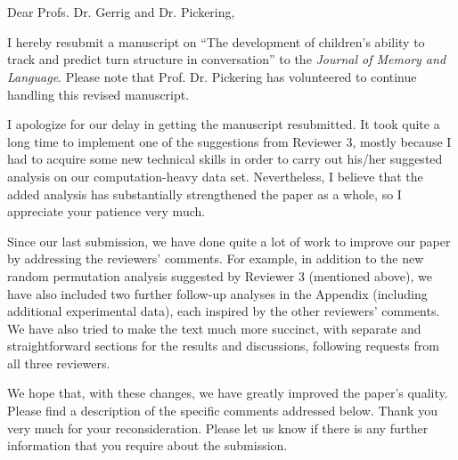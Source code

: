 \documentclass[11pt,a4paper]{letter} %
\def\opening#1{\thispagestyle{empty}
{\centering\fromaddress \vspace{0.6in} \\ %
\hspace*{\longindentation}\hspace*{\fill}\par} %
{\raggedright \toname \\ \toaddress \par} %
\vspace{0.4in} %
\noindent #1 %
}
\begin{document}

\begin{letter}{}


\opening{Dear Profs.  Dr. Gerrig and Dr. Pickering,}

\smallskip

\noindent I hereby resubmit a manuscript on ``The development of children's ability to track and predict turn structure in conversation'' to the \textit{Journal of Memory and Language}. Please note that Prof. Dr. Pickering has volunteered to continue handling this revised manuscript.

\noindent I apologize for our delay in getting the manuscript resubmitted. It took quite a long time to implement one of the suggestions from Reviewer 3, mostly because I had to acquire some new technical skills in order to carry out his/her suggested analysis on our computation-heavy data set. Nevertheless, I believe that the added analysis has substantially strengthened the paper as a whole, so I appreciate your patience very much.

\noindent Since our last submission, we have done quite a lot of work to improve our paper by addressing the reviewers' comments. For example, in addition to the new random permutation analysis suggested by Reviewer 3 (mentioned above), we have also included two further follow-up analyses in the Appendix (including additional experimental data), each inspired by the other reviewers' comments. We have also tried to make the text much more succinct, with separate and straightforward sections for the results and discussions, following requests from all three reviewers. 

\noindent We hope that, with these changes, we have greatly improved the paper's quality. Please find a description of the specific comments addressed below. Thank you very much for your reconsideration. Please let us know if there is any further information that you require about the submission.


\end{letter}
\end{document}
